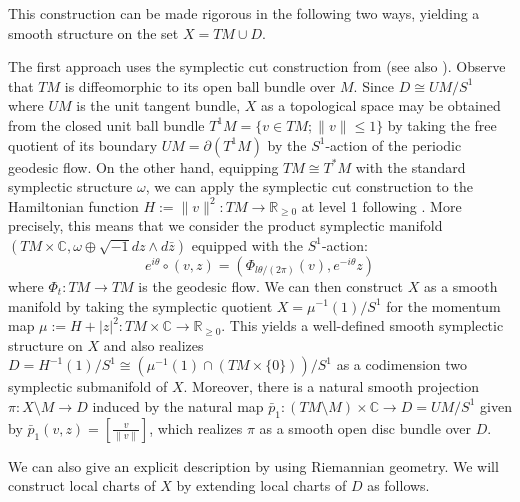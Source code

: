 \documentclass[a4paper, 12pt]{article}
\newcommand{\bC}{\mathbb{C}}
\newcommand{\bR}{\mathbb{R}}
\begin{document}
This construction can be made rigorous in the following two ways, yielding a smooth structure on the set $X = TM \cup D$.

The first approach uses the symplectic cut construction from \cite{Ler95} (see also \cite{A07}). Observe that $TM$ is diffeomorphic to its open ball bundle over $M$.
Since $D\cong UM/S^1$ where $UM$ is the unit tangent bundle, $X$ as a topological space may be obtained from the closed unit ball bundle $T^1M=\{v\in TM; \|v\|\le 1\}$ by taking the free quotient of its boundary $UM=\partial(T^1 M)$ by the $S^1$-action of the periodic geodesic flow.
On the other hand, equipping $TM\cong T^*M$ with the standard symplectic structure $\omega$, 
we can apply the symplectic cut construction to the Hamiltonian function $H:=\|v\|^2: TM\rightarrow \bR_{\ge 0}$ at level 1 following \cite[1.1: Basic construction]{Ler95}. More precisely, this means that we consider the product symplectic manifold $(TM\times \bC, \omega\oplus \sqrt{-1}dz\wedge d\bar{z})$ equipped with the $S^1$-action:
\begin{equation*}
    e^{i\theta}\circ (v, z)=(\Phi_{l\theta/(2\pi)}(v), e^{-i\theta} z)
\end{equation*}
where $\Phi_t: TM\rightarrow TM$ is the geodesic flow. We can then construct $X$ as a smooth manifold by taking the symplectic quotient $X=\mu^{-1}(1)/S^1$ for the momentum map $\mu:=H+|z|^2: TM\times \bC\rightarrow \bR_{\ge 0}$. This yields a well-defined smooth symplectic structure on $X$ and also realizes $D=H^{-1}(1)/S^1\cong (\mu^{-1}(1)\cap (TM\times \{0\}))/S^1$ as a codimension two symplectic submanifold of $X$. Moreover, there is a natural smooth projection $\pi: X\setminus M\rightarrow D$ induced by the natural map $\bar{p}_1: (TM\setminus M)\times \bC\rightarrow D=UM/S^1$ given by  $\bar{p}_1(v, z)=\left[\frac{v}{\|v\|}\right]$, which realizes $\pi$ as a smooth open disc bundle over $D$. 

We can also give an explicit description by using Riemannian geometry. We will construct local charts of $X$ by extending local charts of $D$ as follows.
\end{document}
